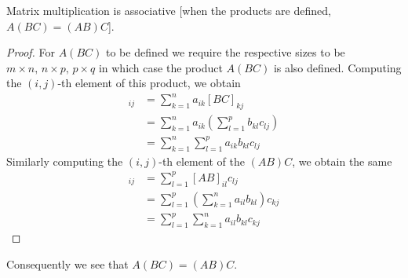 \documentclass[10pt, a4paper]{article}
\begin{document}
\begin{theorem}
    Matrix multiplication is associative [when the products are defined, $A(BC) = (AB)C$].

    \begin{proof}
        For $A(BC)$ to be defined we require the respective sizes to be $m\times n,\, n\times p,\, p\times q$ in which case the product $A(BC)$ is also defined. Computing the $(i, j)$-th element of this product, we obtain
        \begin{align*}
            [A(BC)]_{ij} &= \sum_{k = 1}^{n}{a_{ik}[BC]_{kj}} \\
            &= \sum_{k = 1}^{n}{a_{ik}\left(\sum_{l = 1}^{p}{b_{kl}c_{lj}}\right)} \\
            &= \sum_{k = 1}^{n}{\sum_{l = 1}^{p}{a_{ik}b_{kl}c_{lj}}}
        \end{align*}
        Similarly computing the $(i, j)$-th element of the $(AB)C$, we obtain the same
        \begin{align*}
            [(AB)C]_{ij} &= \sum_{l = 1}^{p} [AB]_{il}c_{lj} \\
            &= \sum_{l = 1}^{p}\left(\sum_{k = 1}^{n} a_{il} b_{kl}\right)c_{kj} \\
            &= \sum_{l = 1}^{p}{\sum_{k = 1}^{n}{a_{il}b_{kl}c_{kj}}}
        \end{align*}
    \end{proof}
    Consequently we see that $A(BC) = (AB)C$.
\end{theorem}
\end{document}
